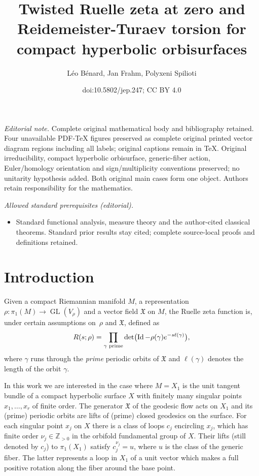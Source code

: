 \documentclass[10pt]{amsart}
\title{Twisted Ruelle zeta at zero and Reidemeister-Turaev torsion for compact hyperbolic orbisurfaces}
\author{Léo Bénard, Jan Frahm, Polyxeni Spilioti}
\date{doi:10.5802/jep.247; CC BY 4.0}
\theoremstyle{plain}
\theoremstyle{definition}
\theoremstyle{remark}
\newcommand{\Z}{\mathbb{Z}}
\DeclareMathOperator{\GL}{GL}
\DeclareMathOperator{\Id}{Id}
\numberwithin{equation}{section}
\providecommand{\mainmatter}{}\providecommand{\backmatter}{}
\begin{document}
\maketitle
\noindent\textit{Editorial note.} Complete original mathematical body and bibliography retained. Four unavailable PDF-TeX figures preserved as complete original printed vector diagram regions including all labels; original captions remain in TeX. Original irreducibility, compact hyperbolic orbisurface, generic-fiber action, Euler/homology orientation and sign/multiplicity conventions preserved; no unitarity hypothesis added. Both original main cases form one object. Authors retain responsibility for the mathematics.\par\medskip
\noindent\textit{Allowed standard prerequisites (editorial).}\begin{itemize}
\item Standard functional analysis, measure theory and the author-cited classical theorems. Standard prior results stay cited; complete source-local proofs and definitions retained.
\end{itemize}\medskip
\vspace*{-\baselineskip}
\tableofcontents
\mainmatter

\section*{Introduction}

Given a compact Riemannian manifold $M$, a representation $\rho \colon \pi_1(M) \to \GL(V_\rho)$ and a vector field $\mathfrak X$ on $M$, the Ruelle zeta function is, under certain assumptions on~$\rho$ and $\mathfrak X$, defined as
\[
R(s;\rho) = \prod_{\gamma \textup{ prime}}\det\bigl(\Id-\rho(\gamma)e^{-s\ell(\gamma)}\bigr),
\]
where $\gamma$ runs through the \emph{prime} periodic orbits of $\mathfrak X$ and $\ell(\gamma)$ denotes the length of the orbit $\gamma$.

In this work we are interested in the case where $M=X_1$ is the unit tangent bundle of a compact hyperbolic surface $X$ with finitely many singular points $x_1, \ldots, x_r$ of finite order. The generator $\mathfrak X$ of the geodesic flow acts on $X_1$ and its (prime) periodic orbits are lifts of (prime) closed geodesics on the surface.
For each singular point $x_j$ on $X$ there is a class of loops $c_j$ encircling $x_j$, which has finite order $\nu_j \in \Z_{>0}$ in the orbifold fundamental group of $X$.
Their lifts (still denoted by $c_j$) to $\pi_1(X_1)$ satisfy $c_j^{\nu_j}= u$,
where $u$ is the class of the generic fiber. The latter represents a loop in $X_1$ of a unit vector which makes a full positive rotation along the fiber around the base point.
\end{document}
